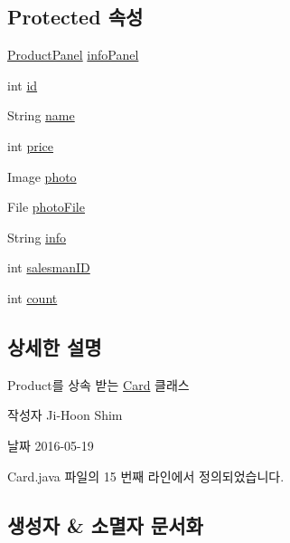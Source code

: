 \subsection*{Protected 속성}
\begin{DoxyCompactItemize}
\item 
\hyperlink{classpkg_1_1_product_panel}{Product\+Panel} \hyperlink{classpkg_1_1_product_a6755de182d9383bc860fa44a8a01789d}{info\+Panel}
\item 
int \hyperlink{classpkg_1_1_product_ac7846687b2d11faba3be1395fcbbab72}{id}
\item 
String \hyperlink{classpkg_1_1_product_acdadb9558664acdfd23eff5b2b77ae90}{name}
\item 
int \hyperlink{classpkg_1_1_product_a46c6eb6906d4ee2f6393515f41dba7c9}{price}
\item 
Image \hyperlink{classpkg_1_1_product_a5d279eb4556860b90305cc26a3ee69be}{photo}
\item 
File \hyperlink{classpkg_1_1_product_a2eeaba74c302ecdc9dd288ff7527ac67}{photo\+File}
\item 
String \hyperlink{classpkg_1_1_product_ade3d909a0e7d15ec98c2f27eecd637cd}{info}
\item 
int \hyperlink{classpkg_1_1_product_aecf411b201022fca17571e9afbc76747}{salesman\+ID}
\item 
int \hyperlink{classpkg_1_1_product_ac136af1e8637edc22218dd9c3383266b}{count}
\end{DoxyCompactItemize}


\subsection{상세한 설명}
Product를 상속 받는 \hyperlink{classpkg_1_1_card}{Card} 클래스 

\begin{DoxyAuthor}{작성자}
Ji-\/\+Hoon Shim 
\end{DoxyAuthor}
\begin{DoxyDate}{날짜}
2016-\/05-\/19 
\end{DoxyDate}


Card.\+java 파일의 15 번째 라인에서 정의되었습니다.



\subsection{생성자 \& 소멸자 문서화}

